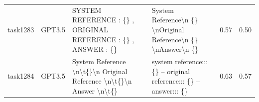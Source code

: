 \begin{longtable}{@{}p{0.8cm\tiny}p{1cm\tiny}p{4.1cm\ttfamily\tiny}p{4.1cm\ttfamily\tiny}p{0.8cm\tiny}p{0.8cm\tiny}@{}}
task1283  & GPT3.5    & SYSTEM REFERENCE : \{\} ,  ORIGINAL REFERENCE : \{\} ,  ANSWER : \{\}                                                                                                                                                                                                                                                                                                                                                                                                                                                   & System Reference\textbackslash{}n \{\} \textbackslash{}nOriginal Reference\textbackslash{}n \{\} \textbackslash{}nAnswer\textbackslash{}n \{\}                                                                                                                                                                                                                                                                                                                                                                                                                                    & 0.57 & 0.50 \\
task1284  & GPT3.5    & System Reference \textbackslash{}n\textbackslash{}t\{\}\textbackslash{}n Original Reference \textbackslash{}n\textbackslash{}t\{\}\textbackslash{}n Answer \textbackslash{}n\textbackslash{}t\{\}                                                                                                                                                                                                                                                                                                                       & system reference::: \{\} -- original reference::: \{\} -- answer::: \{\}                                                                                                                                                                                                                                                                                                                                                                                                                                                                                                          & 0.63 & 0.57 \\

\end{longtable}
